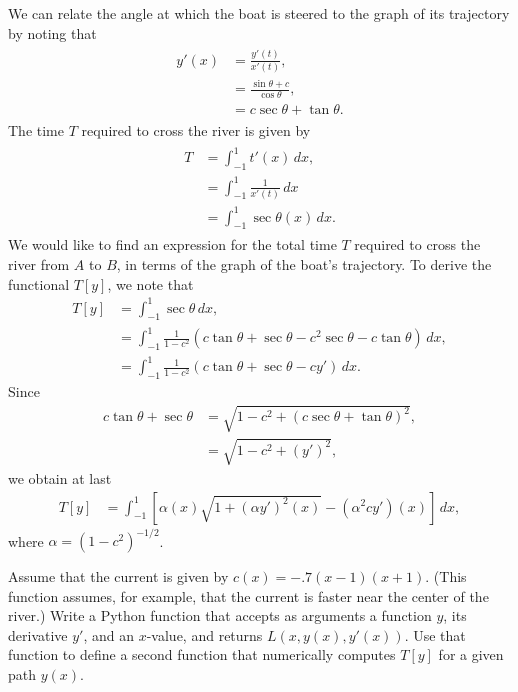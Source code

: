 We can relate the angle at which the boat is steered to the graph of its trajectory by noting that 
\begin{align}
\begin{split}
	y'(x) &= \frac{y'(t)}{x'(t)} ,\\
	&= \frac{\sin \theta + c}{\cos \theta},\\
	&= c\sec \theta + \tan \theta .%
\end{split} \label{rivercrossing:angle}
\end{align}
The time $T$ required to cross the river is given by
\begin{align}
\begin{split}
	T &= \int_{-1}^1 t'(x)\, dx, \\
	&= \int_{-1}^1 \frac{1}{x'(t)}\, dx \\ 
	&= \int_{-1}^1 \sec \theta (x)\, dx. 
\end{split}\label{rivercrossing:T}
\end{align}
We would like to find an expression for the total time $T$ required to cross the river from $A$ to $B$, in terms of the graph of the boat's trajectory. 
To derive the functional $T[y]$, we note that 
\begin{align*}
	T[y] &= \int_{-1}^1 \sec \theta\, dx,\\
	&= \int_{-1}^1 \frac{1}{1-c^2}(c \tan \theta + \sec \theta -c^2 \sec \theta - c\tan \theta)\, dx, \\
	&= \int_{-1}^1 \frac{1}{1-c^2}(c \tan \theta + \sec \theta -c y' )\, dx.	
\end{align*}
Since 
\begin{align*}
	c\tan \theta + \sec \theta &= \sqrt{1 - c^2 + (c \sec \theta + \tan \theta)^2},\\
	&= \sqrt{1 - c^2 + (y')^2},
\end{align*}
we obtain at last
\begin{align}
	T[y] &= \int_{-1}^1 \left[ \alpha(x)\sqrt{1 + (\alpha y')^2(x)} - (\alpha^2 c y')(x) \right]\, dx,
\end{align}
where $\alpha = (1 - c^2)^{-1/2}$.

\begin{problem}
Assume that the current is given by $c(x) = -.7(x-1)(x+1)$. (This function assumes, for example, that the current is faster near the center of the river.)
Write a Python function that accepts as arguments a function $y$, its derivative $y'$, and an $x$-value, and returns $L(x,y(x),y'(x))$. Use that function to define a second function that numerically computes $T[y]$ for a given path $y(x)$.
\end{problem}

